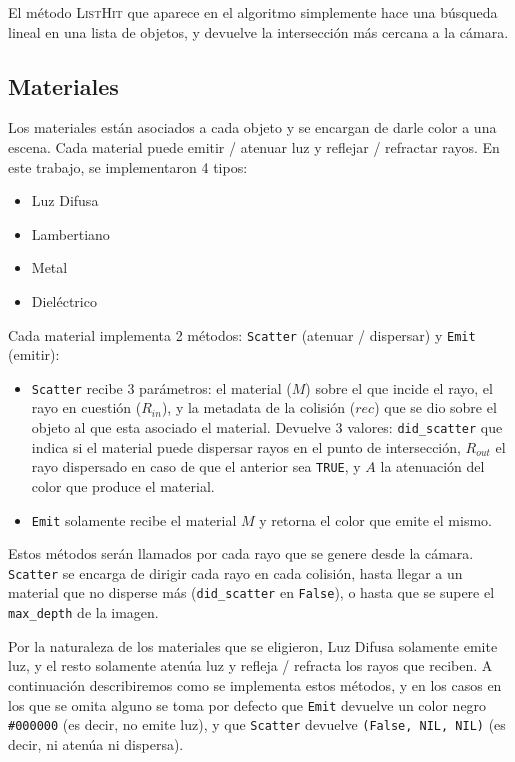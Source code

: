 El método \textsc{ListHit} que aparece en el algoritmo simplemente hace una
búsqueda lineal en una lista de objetos, y devuelve la intersección más cercana
a la cámara.

\subsection{Materiales}

Los materiales están asociados a cada objeto y se encargan de darle color a una
escena. Cada material puede emitir / atenuar luz y reflejar / refractar
rayos. En este trabajo, se implementaron 4 tipos:

\begin{itemize}
  \item Luz Difusa
  \item Lambertiano
  \item Metal
  \item Dieléctrico
\end{itemize}

Cada material implementa 2 métodos: \texttt{Scatter} (atenuar / dispersar) y
\texttt{Emit} (emitir):

\begin{itemize}
  \item \texttt{Scatter} recibe 3 parámetros: el material ($M$) sobre el que
        incide el rayo, el rayo en cuestión ($R_{in}$), y la metadata de la
        colisión ($rec$) que se dio sobre el objeto al que esta asociado el
        material. Devuelve 3 valores: \texttt{did\_scatter} que indica si el
        material puede dispersar rayos en el punto de intersección,
        $R_{out}$ el rayo dispersado en caso de que el anterior sea
        \texttt{TRUE}, y $A$ la atenuación del color que produce el material.
  \item \texttt{Emit} solamente recibe el material $M$ y retorna el color que
        emite el mismo.
\end{itemize}

Estos métodos serán llamados por cada rayo que se genere desde la cámara.
\texttt{Scatter} se encarga de dirigir cada rayo en cada colisión, hasta llegar
a un material que no disperse más (\texttt{did\_scatter} en \texttt{False}), o
hasta que se supere el \texttt{max\_depth} de la imagen.

Por la naturaleza de los materiales que se eligieron, Luz Difusa solamente emite
luz, y el resto solamente atenúa luz  y refleja / refracta los rayos que
reciben. A continuación describiremos como se implementa estos métodos, y en los
casos en los que se omita alguno se toma por defecto que \texttt{Emit} devuelve
un color negro \texttt{\#000000} (es decir, no emite luz), y que
\texttt{Scatter} devuelve \texttt{(False, NIL, NIL)} (es decir, ni atenúa ni
dispersa).

